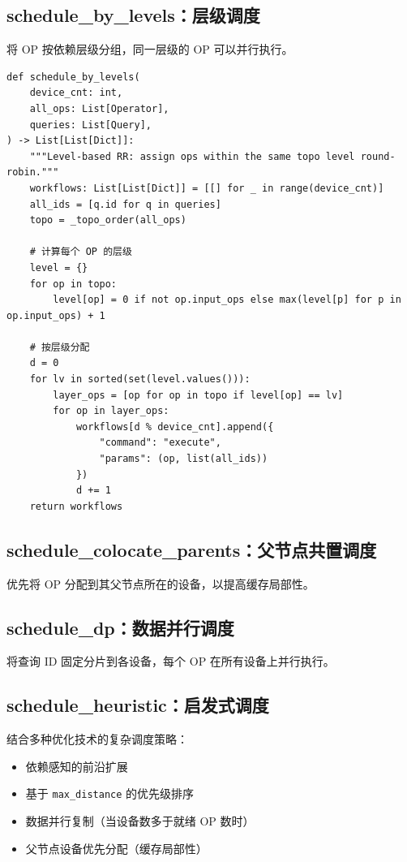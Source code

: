 \documentclass[12pt,a4paper]{article}
\begin{document}
\subsection{schedule\_by\_levels：层级调度}

将 OP 按依赖层级分组，同一层级的 OP 可以并行执行。

\begin{lstlisting}
def schedule_by_levels(
    device_cnt: int,
    all_ops: List[Operator],
    queries: List[Query],
) -> List[List[Dict]]:
    """Level-based RR: assign ops within the same topo level round-robin."""
    workflows: List[List[Dict]] = [[] for _ in range(device_cnt)]
    all_ids = [q.id for q in queries]
    topo = _topo_order(all_ops)
    
    # 计算每个 OP 的层级
    level = {}
    for op in topo:
        level[op] = 0 if not op.input_ops else max(level[p] for p in op.input_ops) + 1
    
    # 按层级分配
    d = 0
    for lv in sorted(set(level.values())):
        layer_ops = [op for op in topo if level[op] == lv]
        for op in layer_ops:
            workflows[d % device_cnt].append({
                "command": "execute",
                "params": (op, list(all_ids))
            })
            d += 1
    return workflows
\end{lstlisting}

\subsection{schedule\_colocate\_parents：父节点共置调度}

优先将 OP 分配到其父节点所在的设备，以提高缓存局部性。

\subsection{schedule\_dp：数据并行调度}

将查询 ID 固定分片到各设备，每个 OP 在所有设备上并行执行。

\subsection{schedule\_heuristic：启发式调度}

结合多种优化技术的复杂调度策略：
\begin{itemize}
    \item 依赖感知的前沿扩展
    \item 基于 \texttt{max\_distance} 的优先级排序
    \item 数据并行复制（当设备数多于就绪 OP 数时）
    \item 父节点设备优先分配（缓存局部性）
\end{itemize}
\end{document}
